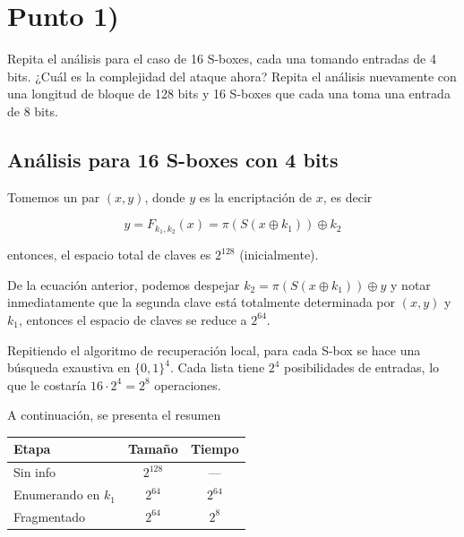 \documentclass{article}
\begin{document}
  \section{Punto 1)}
    Repita el análisis para el caso de 16 S-boxes, cada una tomando 
    entradas de 4 bits. ¿Cuál es la complejidad del ataque ahora? Repita 
    el análisis nuevamente con una longitud de bloque de 128 bits y 16 S-boxes
    que cada una toma una entrada de 8 bits.

    \subsection{Análisis para 16 S-boxes con 4 bits}
      Tomemos un par $(x, y)$, donde $y$ es la encriptación de $x$, es decir

        \[y = F_{k_1, k_2}(x) = \pi(S(x \oplus k_1)) \oplus k_2\]

      entonces, el espacio total de claves es $2^{128}$ (inicialmente).
      \newline \newline

      De la ecuación anterior, podemos despejar $k_2 =  \pi(S(x \oplus k_1)) \oplus y$ 
      y notar inmediatamente que la segunda clave está totalmente determinada 
      por $(x, y)$ y $k_1$, entonces el espacio de claves se reduce a $2^{64}$.
      \newline \newline

      Repitiendo el algoritmo de recuperación local, para cada 
      S-box se hace una búsqueda exaustiva en $\{0, 1\}^4$. Cada 
      lista tiene $2^4$ posibilidades de entradas, lo que le costaría
      $16 \cdot 2^4 = 2^8$ operaciones.
      
      A continuación, se presenta el resumen
      \begin{table}[h]
        \centering

        \vspace{0.2cm}
        \begin{tabular}{lcc}
          \toprule
          Etapa & Tamaño & Tiempo \\
          \midrule
          Sin info & $2^{128}$ & --- \\
          Enumerando en $k_1$ & $2^{64}$ & $2^{64}$ \\
          Fragmentado & $2^{64}$ & $2^{8}$ \\
          \bottomrule
        \end{tabular}
      \end{table}
\end{document}
